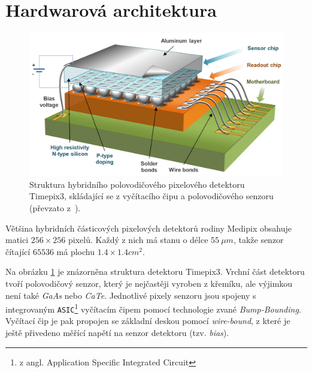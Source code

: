 \section{Hardwarová architektura}
\begin{figure}[th]
	\begin{center}
		\includegraphics[width=12cm]{figures/det_chip.png}
		\caption{Struktura hybridního polovodičového pixelového detektoru Timepix3, skládající se z vyčítacího čipu a polovodičového senzoru (převzato z~\cite{PlatkevicDisertace}).}
		\label{fig:det:chip}
	\end{center}
\end{figure}
Většina hybridních částicových pixelových detektorů rodiny Medipix obsahuje matici $256\times256$ pixelů. Každý z nich má stanu o délce $55~\mu m$, takže senzor čítající $65536$ má plochu $1.4 \times 1.4 cm^2$. 

Na obrázku \ref{fig:det:chip} je znázorněna struktura detektoru Timepix3. Vrchní část detektoru tvoří polovodičový senzor, který je nejčastěji vyroben z křemíku, ale výjimkou není také \textit{GaAs} nebo \textit{CaTe}. Jednotlivé pixely senzoru jsou spojeny s integrovaným \texttt{ASIC}\footnote{z angl. Application Specific Integrated Circuit} vyčítacím čipem pomocí technologie zvané \textit{Bump-Bounding}. Vyčítací čip je pak propojen se základní deskou pomocí \textit{wire-bound}, z které je ještě přivedeno měřící napětí na senzor detektoru (tzv. \textit{bias}).


